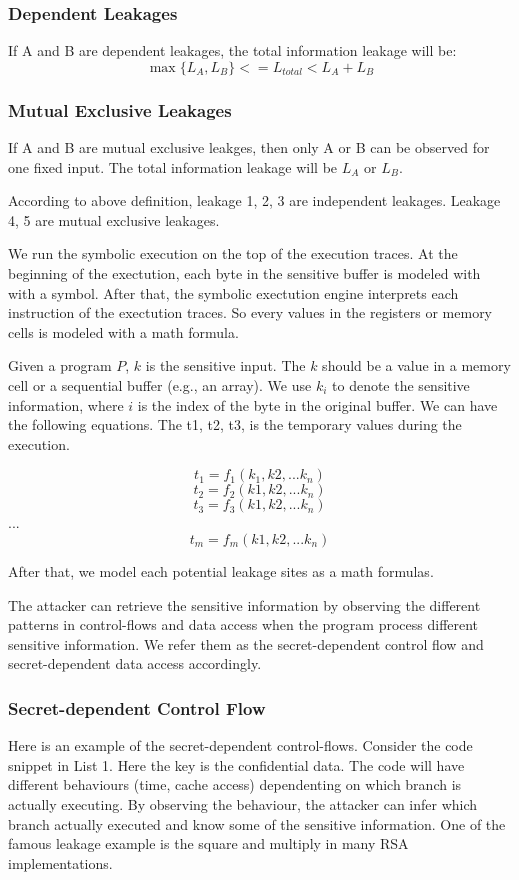 \subsubsection{Dependent Leakages}
If A and B are dependent leakages, the total information leakage will be:
\begin{displaymath}
\label{dependent leakage}
    \max{\{L_A, L_B\}}  <= L_{total} < L_A + L_B 
\end{displaymath}

\subsubsection{Mutual Exclusive Leakages}
If A and B are mutual exclusive leakges, then only A or B can be observed for one fixed input.
The total information leakage will be $L_A$ or $L_B$.

According to above definition, leakage 1, 2, 3 are independent leakages. Leakage 4, 5
are mutual exclusive leakages. 

We run the symbolic execution on the top of the execution traces. At the beginning of the exectution,
each byte in the sensitive buffer is modeled with with a symbol. After that, the symbolic
exectution engine interprets each instruction of the exectution traces. So every values in the
registers or memory cells is modeled with a math formula.

Given a program $P$, $k$ is the sensitive input. The $k$ should be a value in a memory cell or a sequential 
buffer (e.g., an array). We use $k_i$ to denote the sensitive information, where $i$ is the index of the byte in
the original buffer. We can have the following equations. The t1, t2, t3, is the temporary values during the execution.

$$t_1 = f_1(k_1, k2, ... k_n)$$
$$t_2 = f_2(k1, k2, ... k_n)$$
$$t_3 = f_3(k1, k2, ... k_n)$$
$...$
$$t_m = f_m(k1, k2, ... k_n)$$

After that, we model each potential leakage sites as a math formulas.

The attacker can retrieve the sensitive information by observing the different patterns in 
control-flows and data access when the program process different sensitive information. 
We refer them as the secret-dependent control flow and secret-dependent data access accordingly.


\subsubsection{Secret-dependent Control Flow}
Here is an example of the secret-dependent control-flows. Consider the code snippet in List 1. 
Here the key is the confidential data. The code will have different behaviours (time, cache access) 
dependenting on which branch is actually executing. By observing the behaviour, 
the attacker can infer which branch actually executed and know some of the sensitive information. 
One of the famous leakage example is the square and multiply in many RSA implementations. 

